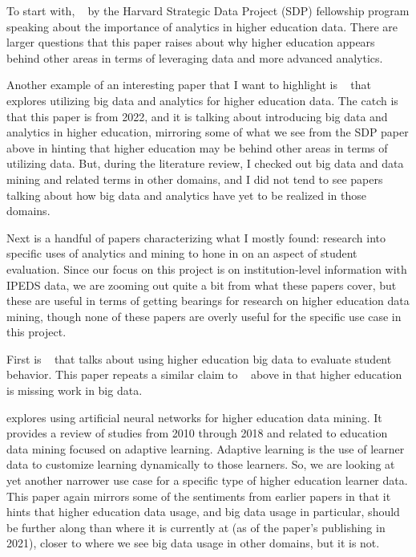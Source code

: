 \documentclass[sigconf, authorversion, nonacm]{acmart}
\begin{document}
    To start with, ~\cite{sdp} by the Harvard Strategic Data Project (SDP) fellowship program speaking about the importance of analytics in higher education data. There are larger questions that this paper raises about why higher education appears behind other areas in terms of leveraging data and more advanced analytics.

    Another example of an interesting paper that I want to highlight is ~\cite{Hassna02102023} that explores utilizing big data and analytics for higher education data. The catch is that this paper is from 2022, and it is talking about introducing big data and analytics in higher education, mirroring some of what we see from the SDP paper above in hinting that higher education may be behind other areas in terms of utilizing data. But, during the literature review, I checked out big data and data mining and related terms in other domains, and I did not tend to see papers talking about how big data and analytics have yet to be realized in those domains.

    Next is a handful of papers characterizing what I mostly found: research into specific uses of analytics and mining to hone in on an aspect of student evaluation. Since our focus on this project is on institution-level information with IPEDS data, we are zooming out quite a bit from what these papers cover, but these are useful in terms of getting bearings for research on higher education data mining, though none of these papers are overly useful for the specific use case in this project.

    First is ~\cite{studentbehavioranalytics} that talks about using higher education big data to evaluate student behavior. This paper repeats a similar claim to ~\cite{Hassna02102023} above in that higher education is missing work in big data.

    \cite{Okewu10112021} explores using artificial neural networks for higher education data mining. It provides a review of studies from 2010 through 2018 and related to education data mining focused on adaptive learning. Adaptive learning is the use of learner data to customize learning dynamically to those learners. So, we are looking at yet another narrower use case for a specific type of higher education learner data. This paper again mirrors some of the sentiments from earlier papers in that it hints that higher education data usage, and big data usage in particular, should be further along than where it is currently at (as of the paper's publishing in 2021), closer to where we see big data usage in other domains, but it is not.
\end{document}

